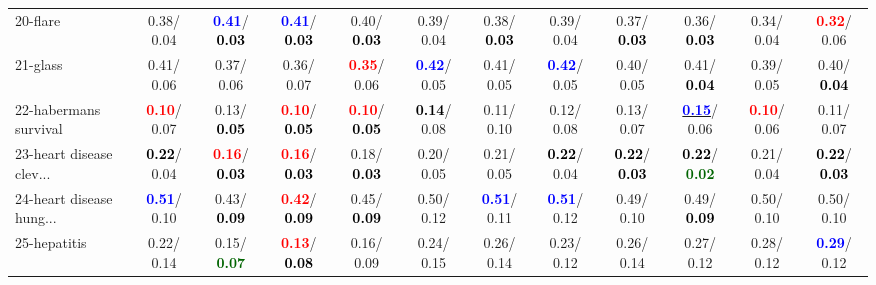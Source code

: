 \begin{table}[h]
\begin{center}
{\begin{tabular}{lc|c|c|c|c|c|c|c|c|c|c}
20-flare &   0.38/  0.04 & \textcolor{blue}{\textbf{  0.41}}/\textcolor{black}{\textbf{  0.03}} & \textcolor{blue}{\textbf{  0.41}}/\textcolor{black}{\textbf{  0.03}} &   0.40/\textcolor{black}{\textbf{  0.03}} &   0.39/  0.04 &   0.38/\textcolor{black}{\textbf{  0.03}} &   0.39/  0.04 &   0.37/\textcolor{black}{\textbf{  0.03}} &   0.36/\textcolor{black}{\textbf{  0.03}} &   0.34/  0.04 & \textcolor{red}{\textbf{  0.32}}/  0.06 \\
21-glass &   0.41/  0.06 &   0.37/  0.06 &   0.36/  0.07 & \textcolor{red}{\textbf{  0.35}}/  0.06 & \textcolor{blue}{\textbf{  0.42}}/  0.05 &   0.41/  0.05 & \textcolor{blue}{\textbf{  0.42}}/  0.05 &   0.40/  0.05 &   0.41/\textcolor{black}{\textbf{  0.04}} &   0.39/  0.05 &   0.40/\textcolor{black}{\textbf{  0.04}} \\ \hline
22-habermans survival & \textcolor{red}{\textbf{  0.10}}/  0.07 &   0.13/\textcolor{black}{\textbf{  0.05}} & \textcolor{red}{\textbf{  0.10}}/\textcolor{black}{\textbf{  0.05}} & \textcolor{red}{\textbf{  0.10}}/\textcolor{black}{\textbf{  0.05}} & \textcolor{black}{\textbf{  0.14}}/  0.08 &   0.11/  0.10 &   0.12/  0.08 &   0.13/  0.07 & \underline{\textcolor{blue}{\textbf{  0.15}}}/  0.06 & \textcolor{red}{\textbf{  0.10}}/  0.06 &   0.11/  0.07 \\
23-heart disease clev... & \textcolor{black}{\textbf{  0.22}}/  0.04 & \textcolor{red}{\textbf{  0.16}}/\textcolor{black}{\textbf{  0.03}} & \textcolor{red}{\textbf{  0.16}}/\textcolor{black}{\textbf{  0.03}} &   0.18/\textcolor{black}{\textbf{  0.03}} &   0.20/  0.05 &   0.21/  0.05 & \textcolor{black}{\textbf{  0.22}}/  0.04 & \textcolor{black}{\textbf{  0.22}}/\textcolor{black}{\textbf{  0.03}} & \textcolor{black}{\textbf{  0.22}}/\textcolor{darkgreen}{\textbf{  0.02}} &   0.21/  0.04 & \textcolor{black}{\textbf{  0.22}}/\textcolor{black}{\textbf{  0.03}} \\
24-heart disease hung... & \textcolor{blue}{\textbf{  0.51}}/  0.10 &   0.43/\textcolor{black}{\textbf{  0.09}} & \textcolor{red}{\textbf{  0.42}}/\textcolor{black}{\textbf{  0.09}} &   0.45/\textcolor{black}{\textbf{  0.09}} &   0.50/  0.12 & \textcolor{blue}{\textbf{  0.51}}/  0.11 & \textcolor{blue}{\textbf{  0.51}}/  0.12 &   0.49/  0.10 &   0.49/\textcolor{black}{\textbf{  0.09}} &   0.50/  0.10 &   0.50/  0.10 \\
25-hepatitis &   0.22/  0.14 &   0.15/\textcolor{darkgreen}{\textbf{  0.07}} & \textcolor{red}{\textbf{  0.13}}/\textcolor{black}{\textbf{  0.08}} &   0.16/  0.09 &   0.24/  0.15 &   0.26/  0.14 &   0.23/  0.12 &   0.26/  0.14 &   0.27/  0.12 &   0.28/  0.12 & \textcolor{blue}{\textbf{  0.29}}/  0.12 \\

\end{tabular}}
\end{center}
\end{table}
